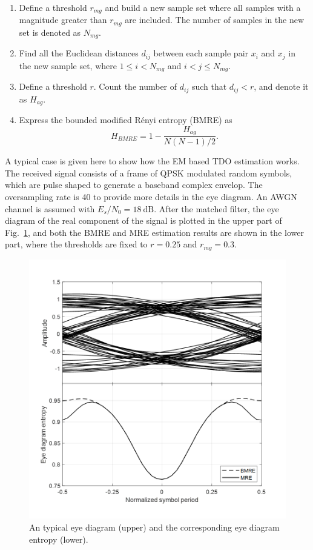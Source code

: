 \documentclass[12pt, draftclsnofoot, onecolumn]{IEEEtran}
\begin{document}
\begin{enumerate}
\item Define a threshold \(r_{mg}\) and build a new sample set where all samples with a magnitude greater than \(r_{mg}\) are included.
The number of samples in the new set is denoted as \(N_{mg}\).
\item Find all the Euclidean distances \(d_{ij}\) between each sample pair \(x_i\) and \(x_j\) in the new sample set, where \(1\le i<N_{mg}\) and \( i<j \le N_{mg}\). 
\item Define a threshold \(r\). Count the number of \(d_{ij}\) such that $d_{ij}<r$, and denote it as $H_{ag}$.
\item Express the bounded modified R\'enyi entropy (BMRE) as
\begin{equation}
H_{BMRE}= 1- \frac{ H_{ag}}{ N(N-1)/2}.
\label{eq:entorpy_ad2}
\end{equation}
\end{enumerate}



A typical case is given here to show how the EM based TDO estimation works.
The received signal consists of a frame of QPSK modulated random symbols, 
which are pulse shaped to generate a baseband complex envelop.
The oversampling rate is 40 to provide more details in the eye diagram.
An AWGN channel is assumed with $E_s/N_0 = 18~\text{dB}$. 
After the matched filter, the eye diagram of the real component of the signal is plotted in the upper part of Fig.~\ref{fig:timing}, and both the BMRE and MRE estimation results are shown in the lower part,
where the thresholds are fixed to $r=0.25$ and \(r_{mg}=0.3\).


\begin{figure}[htbp]
\centering
\includegraphics[width=3 in]{pic/timing.png}
\caption{An typical eye diagram (upper) and the corresponding eye diagram entropy (lower).}
\label{fig:timing} 
\end{figure}
\end{document}
